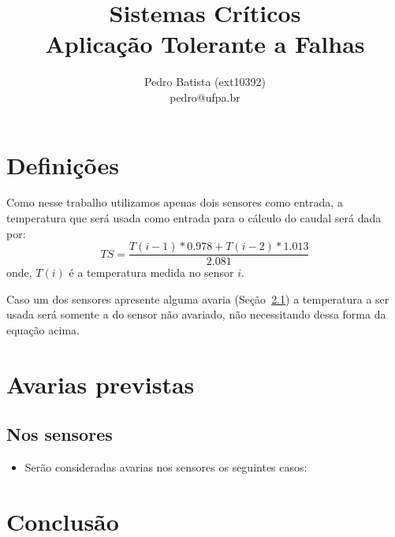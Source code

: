 \documentclass[a4paper,12pt]{article}
\title{Sistemas Críticos\\[10pt]
\Large{Aplicação Tolerante a Falhas}}
\author{Pedro Batista (ext10392)\\
pedro@ufpa.br}
\begin{document}
\maketitle

\section{Definições}
Como nesse trabalho utilizamos apenas dois sensores como entrada, a temperatura
que será usada como entrada para o cálculo do caudal será dada por:
$$TS=\frac{T(i-1)*0.978+T(i-2)*1.013}{2.081}$$
onde,
$T(i)$ é a temperatura medida no sensor $i$.

Caso um dos sensores apresente alguma avaria (Seção~\ref{sec:av_sensor}) a
temperatura a ser usada será somente a do sensor não avariado, não necessitando
dessa forma da equação acima.

\section{Avarias previstas}

\subsection{Nos sensores}\label{sec:av_sensor}
\begin{itemize}
	\item Serão consideradas avarias nos sensores os seguintes casos:
\end{itemize}

\section{Conclusão}
\end{document}
